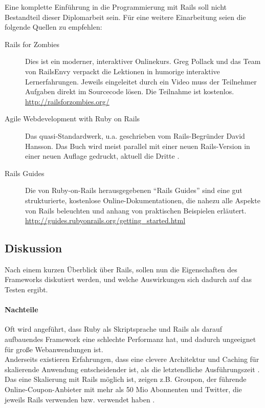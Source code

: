 Eine komplette Einführung in die Programmierung mit Rails soll nicht Bestandteil dieser Diplomarbeit sein. Für eine weitere Einarbeitung seien die folgende Quellen zu empfehlen:
\begin{description}
 \item[Rails for Zombies] Dies ist ein moderner, interaktiver Onlinekurs. Greg Pollack und das Team von RailsEnvy verpackt die Lektionen in humorige interaktive Lernerfahrungen. Jeweils eingeleitet durch ein Video muss der Teilnehmer Aufgaben direkt im Sourcecode lösen. Die Teilnahme ist kostenlos.\\
 \url{http://railsforzombies.org/}
 \item[Agile Webdevelopment with Ruby on Rails] Das quasi-Standardwerk, u.a. geschrieben vom Rails-Begründer David Hansson. Das Buch wird meist parallel mit einer neuen Rails-Version in einer neuen Auflage gedruckt, aktuell die Dritte \citep{ruby_agile_2009}.
 \item[Rails Guides] Die von Ruby-on-Rails herausgegebenen "`Rails Guides"' sind eine gut strukturierte, kostenlose Online-Dokumentationen, die nahezu alle Aspekte von Rails beleuchten und anhang von praktischen Beispielen erläutert.\\
 \url{http://guides.rubyonrails.org/getting_started.html}
 \end{description}



\subsection{Diskussion}
Nach einem kurzen Überblick über Rails, sollen nun die Eigenschaften des Frameworks diskutiert werden, und welche Auswirkungen sich dadurch auf das Testen ergibt.

\paragraph{Nachteile}

Oft wird angeführt, dass Ruby als Skriptsprache und Rails als darauf aufbauendes Framework eine schlechte Performanz hat, und dadurch ungeeignet für große Webanwendungen ist.\\
Anderseits existieren Erfahrungen, dass eine clevere Architektur und Caching für skalierende Anwendung entscheidender ist, als die letztendliche Ausführungszeit \citep{kirk_haines_ruby_2010}.
Das eine Skalierung mit Rails möglich ist, zeigen z.B. Groupon, der führende Online-Coupon-Anbieter mit mehr als 50 Mio Abonnenten und Twitter, die jeweils Rails verwenden bzw. verwendet haben \citep{ruby_on_rails_2011}.


